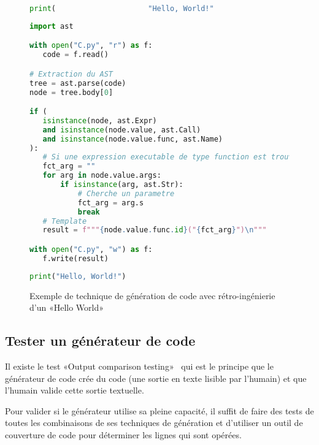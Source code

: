 \begin{figure}
\begin{lstlisting}[language=Python, upquote=true, caption={C mal formaté - fichier C.py de Figure~\ref{fig:exemple_gen_code_retro}}, label={lst:gen_code_retro_c}]
print(                     "Hello, World!"                         )
\end{lstlisting}

\begin{lstlisting}[language=Python, upquote=true, caption={M qui extrait µ$_C$ pour générer C.py de Figure~\ref{fig:exemple_gen_code_retro}}, label={lst:gen_code_retro_m}]
import ast

with open("C.py", "r") as f:
   code = f.read()

# Extraction du AST
tree = ast.parse(code)
node = tree.body[0]

if (
   isinstance(node, ast.Expr)
   and isinstance(node.value, ast.Call)
   and isinstance(node.value.func, ast.Name)
):
   # Si une expression executable de type function est trouve
   fct_arg = ""
   for arg in node.value.args:
       if isinstance(arg, ast.Str):
           # Cherche un parametre
           fct_arg = arg.s
           break
   # Template
   result = f"""{node.value.func.id}("{fct_arg}")\n"""

with open("C.py", "w") as f:
   f.write(result)
\end{lstlisting}

\begin{lstlisting}[language=Python, upquote=true, caption={C corrigé - fichier C.py de Figure~\ref{fig:exemple_gen_code_retro}}, label={lst:gen_code_retro_new_c}]
print("Hello, World!")
\end{lstlisting}
\caption{Exemple de technique de génération de code avec rétro-ingénierie d'un «Hello World»}
\label{fig:exemple_gen_code_retro}
\end{figure}

\subsection{Tester un générateur de code}

Il existe le test «Output comparison testing»~\cite{wikipedia_test_informatique} qui est le principe que le générateur de code crée du code (une sortie en texte lisible par l'humain) et que l'humain valide cette sortie textuelle.

Pour valider si le générateur utilise sa pleine capacité, il suffit de faire des tests de toutes les combinaisons de ses techniques de génération et d'utiliser un outil de couverture de code pour déterminer les lignes qui sont opérées.
